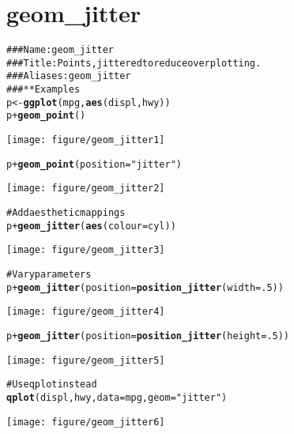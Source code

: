\documentclass[a4paper,titlepage]{tufte-handout}\usepackage{graphicx, color}
\makeatletter
\def\maxwidth{ %
  \ifdim\Gin@nat@width>\linewidth
    \linewidth
  \else
    \Gin@nat@width
  \fi
}
\newcommand{\hlfunctioncall}[1]{\textcolor[rgb]{0.501960784313725,0,0.329411764705882}{\textbf{#1}}}%
\newcommand{\hlstring}[1]{\textcolor[rgb]{0.6,0.6,1}{#1}}%
\newcommand{\hlcomment}[1]{\textcolor[rgb]{0.180392156862745,0.6,0.341176470588235}{#1}}%
\newenvironment{kframe}{%
 \def\at@end@of@kframe{}%
 \ifinner\ifhmode%
  \def\at@end@of@kframe{\end{minipage}}%
  \begin{minipage}{\columnwidth}%
 \fi\fi%
 \def\FrameCommand##1{\hskip\@totalleftmargin \hskip-\fboxsep
 \colorbox{shadecolor}{##1}\hskip-\fboxsep
     \hskip-\linewidth \hskip-\@totalleftmargin \hskip\columnwidth}%
 \MakeFramed {\advance\hsize-\width
   \@totalleftmargin\z@ \linewidth\hsize
   \@setminipage}}%
 {\par\unskip\endMakeFramed%
 \at@end@of@kframe}
\newenvironment{knitrout}{}{} %
\makeatother
\begin{document}
\section{geom\_jitter}

\begin{knitrout}
\color{fgcolor}\begin{kframe}
\begin{alltt}
\hlcomment{### Name: geom_jitter}
\hlcomment{### Title: Points, jittered to reduce overplotting.}
\hlcomment{### Aliases: geom_jitter}
\hlcomment{### ** Examples}
p <- \hlfunctioncall{ggplot}(mpg, \hlfunctioncall{aes}(displ, hwy))
p + \hlfunctioncall{geom_point}()
\end{alltt}
\end{kframe}\texttt{[image: figure/geom\_jitter1]} \begin{kframe}\begin{alltt}
p + \hlfunctioncall{geom_point}(position = \hlstring{"jitter"})
\end{alltt}
\end{kframe}\texttt{[image: figure/geom\_jitter2]} \begin{kframe}\begin{alltt}
\hlcomment{# Add aesthetic mappings}
p + \hlfunctioncall{geom_jitter}(\hlfunctioncall{aes}(colour = cyl))
\end{alltt}
\end{kframe}\texttt{[image: figure/geom\_jitter3]} \begin{kframe}\begin{alltt}
\hlcomment{# Vary parameters}
p + \hlfunctioncall{geom_jitter}(position = \hlfunctioncall{position_jitter}(width = .5))
\end{alltt}
\end{kframe}\texttt{[image: figure/geom\_jitter4]} \begin{kframe}\begin{alltt}
p + \hlfunctioncall{geom_jitter}(position = \hlfunctioncall{position_jitter}(height = .5))
\end{alltt}
\end{kframe}\texttt{[image: figure/geom\_jitter5]} \begin{kframe}\begin{alltt}
\hlcomment{# Use qplot instead}
\hlfunctioncall{qplot}(displ, hwy, data = mpg, geom = \hlstring{"jitter"})
\end{alltt}
\end{kframe}\texttt{[image: figure/geom\_jitter6]} \begin{kframe}\begin{alltt}

\end{alltt}
\end{kframe}
\end{knitrout}
\end{document}
